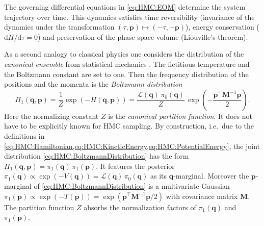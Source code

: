 The governing differential equations in \cref{eq:HMC:EOM} determine the system trajectory over time.
This dynamics satisfies time reversibility (invariance of the dynamics under the transformation \((\tau,\bm{p}) \mapsto (-\tau,-\bm{p})\)),
energy conservation (\(\mathrm{d} H / \mathrm{d} \tau = 0\)) and preservation of the phase space volume (Liouville's theorem).
\par %
As a second analogy to classical physics one considers the distribution of the \textit{canonical ensemble} from statistical mechanics \cite{Physics:Schwabl2006}.
The fictitious temperature and the Boltzmann constant are set to one.
Then the frequency distribution of the positions and the momenta is the \textit{Boltzmann distribution}
\begin{equation} \label{eq:HMC:BoltzmannDistribution}
  \varPi_1(\bm{q},\bm{p}) = \frac{1}{Z} \exp (-H(\bm{q},\bm{p})) = \frac{\mathcal{L}(\bm{q}) \, \pi_0(\bm{q})}{Z} \, \exp \left( - \frac{\bm{p}^{\top} \bm{M}^{-1} \bm{p}}{2} \right).
\end{equation}
Here the normalizing constant \(Z\) is the \textit{canonical partition function}.
It does not have to be explicitly known for HMC sampling.
By construction, i.e.\ due to the definitions in \cref{eq:HMC:Hamiltonian,eq:HMC:KineticEnergy,eq:HMC:PotentialEnergy},
the joint distribution \cref{eq:HMC:BoltzmannDistribution} has the form \(\varPi_1(\bm{q},\bm{p}) = \pi_1(\bm{q}) \, \pi_1(\bm{p})\). 
It features the posterior \(\pi_1(\bm{q}) \propto \exp(-V(\bm{q})) = \mathcal{L}(\bm{q}) \, \pi_0(\bm{q})\) as its \(\bm{q}\)-marginal.
Moreover the \(\bm{p}\)-marginal of \cref{eq:HMC:BoltzmannDistribution} is a multivariate Gaussian \(\pi_1(\bm{p}) \propto \exp(-T(\bm{p})) = \exp (\bm{p}^{\top} \bm{M}^{-1} \bm{p} / 2)\) with covariance matrix \(\bm{M}\).
The partition function \(Z\) absorbs the normalization factors of \(\pi_1(\bm{q})\) and \(\pi_1(\bm{p})\).

